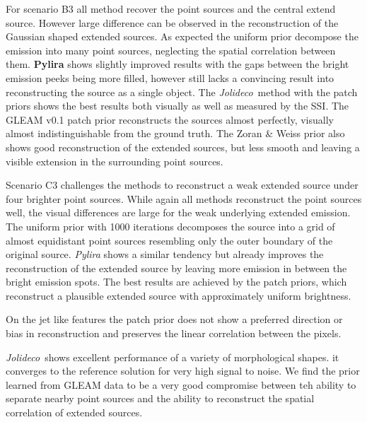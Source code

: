 \documentclass[twocolumn]{aastex631}
\newcommand{\jolideco}{\textit{Jolideco}~}
\begin{document}
    For scenario B3 all method recover the point sources and the central extend source. However large difference can be observed in the reconstruction of the Gaussian shaped extended sources. As expected the uniform prior decompose the emission into many point sources, neglecting the spatial correlation between them. \textbf{Pylira} shows slightly improved results with the gaps between the bright emission peeks being more filled, however still lacks a convincing result into reconstructing the source as a single object. The \jolideco method with the patch priors shows the best results both visually as well as measured by the SSI. The GLEAM v0.1 patch prior reconstructs the sources almost perfectly, visually almost indistinguishable from the ground truth. The Zoran \& Weiss prior also shows good reconstruction of the extended sources, but less smooth and leaving a visible extension in the surrounding point sources.

    Scenario C3 challenges the methods to reconstruct a weak extended source under four brighter point sources. While again all methods reconstruct the point sources well, the visual differences are large for the weak underlying extended emission. The uniform prior with 1000 iterations decomposes the source into a grid of almost equidistant point sources resembling only the outer boundary of the original source. \textit{Pylira} shows a similar tendency but already improves the reconstruction of the extended source by leaving more emission in between the bright emission spots. The best results are achieved by the patch priors, which reconstruct a plausible extended source with approximately uniform brightness. 

    On the jet like features the patch prior does not show a preferred direction or bias in reconstruction and preserves the linear correlation between the pixels. 
    
    \jolideco shows excellent performance of a variety of morphological shapes. 
    it converges to the reference solution for very high signal to noise. We find the prior learned from GLEAM data to be a very good compromise between teh ability to separate nearby point sources and the ability to reconstruct the spatial correlation of extended sources.
    
\end{document}
